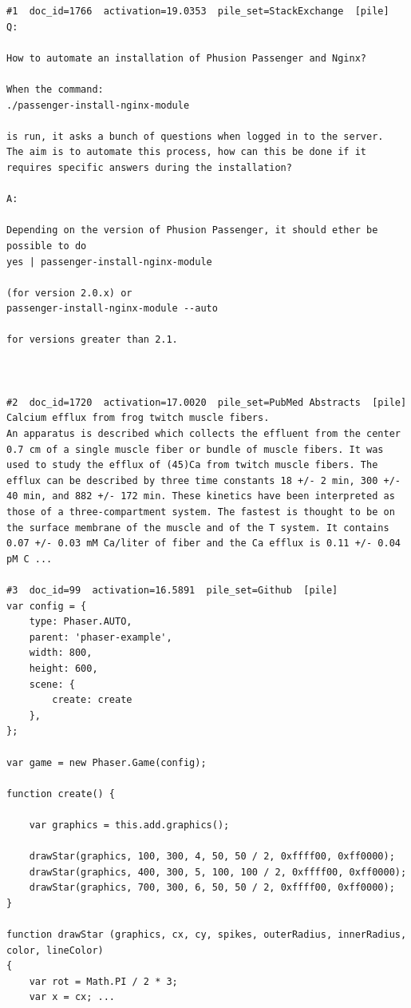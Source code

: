 \begin{verbatim}
#1  doc_id=1766  activation=19.0353  pile_set=StackExchange  [pile]
Q:

How to automate an installation of Phusion Passenger and Nginx?

When the command:
./passenger-install-nginx-module

is run, it asks a bunch of questions when logged in to the server.
The aim is to automate this process, how can this be done if it requires specific answers during the installation?

A:

Depending on the version of Phusion Passenger, it should ether be possible to do
yes | passenger-install-nginx-module

(for version 2.0.x) or
passenger-install-nginx-module --auto

for versions greater than 2.1.



#2  doc_id=1720  activation=17.0020  pile_set=PubMed Abstracts  [pile]
Calcium efflux from frog twitch muscle fibers.
An apparatus is described which collects the effluent from the center 0.7 cm of a single muscle fiber or bundle of muscle fibers. It was used to study the efflux of (45)Ca from twitch muscle fibers. The efflux can be described by three time constants 18 +/- 2 min, 300 +/- 40 min, and 882 +/- 172 min. These kinetics have been interpreted as those of a three-compartment system. The fastest is thought to be on the surface membrane of the muscle and of the T system. It contains 0.07 +/- 0.03 mM Ca/liter of fiber and the Ca efflux is 0.11 +/- 0.04 pM C ...

#3  doc_id=99  activation=16.5891  pile_set=Github  [pile]
var config = {
    type: Phaser.AUTO,
    parent: 'phaser-example',
    width: 800,
    height: 600,
    scene: {
        create: create
    },
};

var game = new Phaser.Game(config);

function create() {

    var graphics = this.add.graphics();

    drawStar(graphics, 100, 300, 4, 50, 50 / 2, 0xffff00, 0xff0000);
    drawStar(graphics, 400, 300, 5, 100, 100 / 2, 0xffff00, 0xff0000);
    drawStar(graphics, 700, 300, 6, 50, 50 / 2, 0xffff00, 0xff0000);
}

function drawStar (graphics, cx, cy, spikes, outerRadius, innerRadius, color, lineColor)
{
    var rot = Math.PI / 2 * 3;
    var x = cx; ...


\end{verbatim}
